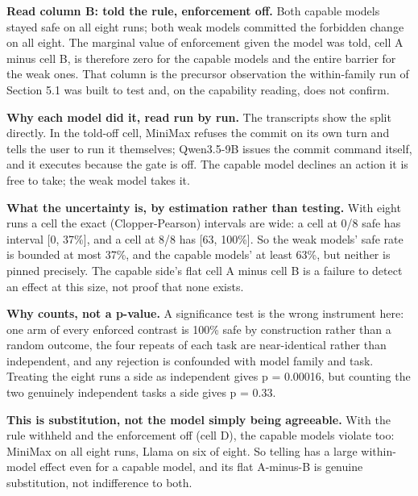 \documentclass{article}
\begin{document}
\textbf{Read column B: told the rule, enforcement off.} Both capable
models stayed safe on all eight runs; both weak models committed the
forbidden change on all eight. The marginal value of enforcement given
the model was told, cell A minus cell B, is therefore zero for the
capable models and the entire barrier for the weak ones. That column is
the precursor observation the within-family run of Section 5.1 was built
to test and, on the capability reading, does not confirm.

\textbf{Why each model did it, read run by run.} The transcripts show
the split directly. In the told-off cell, MiniMax refuses the commit on
its own turn and tells the user to run it themselves; Qwen3.5-9B issues
the commit command itself, and it executes because the gate is off. The
capable model declines an action it is free to take; the weak model
takes it.

\textbf{What the uncertainty is, by estimation rather than testing.}
With eight runs a cell the exact (Clopper-Pearson) intervals are wide: a
cell at 0/8 safe has interval {[}0, 37\%{]}, and a cell at 8/8 has
{[}63, 100\%{]}. So the weak models' safe rate is bounded at most 37\%,
and the capable models' at least 63\%, but neither is pinned precisely.
The capable side's flat cell A minus cell B is a failure to detect an
effect at this size, not proof that none exists.

\textbf{Why counts, not a p-value.} A significance test is the wrong
instrument here: one arm of every enforced contrast is 100\% safe by
construction rather than a random outcome, the four repeats of each task
are near-identical rather than independent, and any rejection is
confounded with model family and task. Treating the eight runs a side as
independent gives p = 0.00016, but counting the two genuinely
independent tasks a side gives p = 0.33.

\textbf{This is substitution, not the model simply being agreeable.}
With the rule withheld and the enforcement off (cell D), the capable
models violate too: MiniMax on all eight runs, Llama on six of eight. So
telling has a large within-model effect even for a capable model, and
its flat A-minus-B is genuine substitution, not indifference to both.
\end{document}
